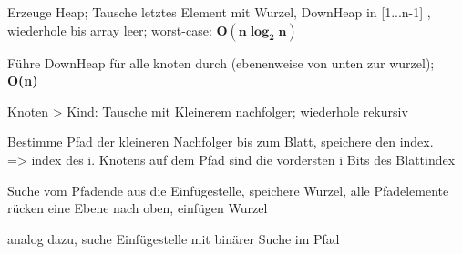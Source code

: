 Erzeuge Heap; 
Tausche letztes Element mit Wurzel, DownHeap in [1...n-1] , wiederhole bis array leer; 
worst-case: $\mathbf{O(n\log_2n)}$

Führe DownHeap für alle knoten durch (ebenenweise von unten zur wurzel); \textbf{O(n)}

Knoten > Kind: Tausche mit Kleinerem nachfolger; wiederhole rekursiv

Bestimme Pfad der kleineren Nachfolger bis zum Blatt, speichere den index.\\ 
=> index des i. Knotens auf dem Pfad sind die vordersten i Bits des Blattindex

Suche vom Pfadende aus die Einfügestelle, speichere Wurzel, alle Pfadelemente rücken eine Ebene nach oben, einfügen Wurzel

 analog dazu, suche Einfügestelle mit binärer Suche im Pfad 




